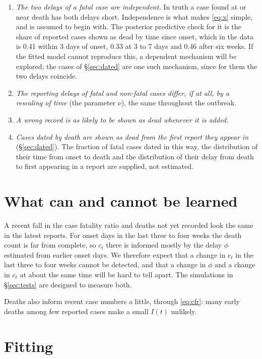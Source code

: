 \documentclass[11pt,a4paper]{article}
\begin{document}
\begin{enumerate}
\item \emph{The two delays of a fatal case are independent.} In truth a
case found at or near death has both delays short. Independence is what
makes \eqref{eq:x} simple, and is assumed to begin with. The posterior
predictive check for it is the share of reported cases shown as dead by time
since onset, which in the data is 0.41 within 3 days of onset, 0.33 at 3 to
7 days and 0.46 after six weeks. If the fitted model cannot reproduce this,
a dependent mechanism will be explored; the cases of \S\ref{sec:dated} are
one such mechanism, since for them the two delays coincide.
\item \emph{The reporting delays of fatal and non-fatal cases differ, if at
all, by a rescaling of time} (the parameter $\nu$), the same throughout the
outbreak.
\item \emph{A wrong record is as likely to be shown as dead whenever it is
added.}
\item \emph{Cases dated by death are shown as dead from the first report
they appear in} (\S\ref{sec:dated}). The fraction of fatal cases dated in
this way, the distribution of their time from onset to death and the
distribution of their delay from death to first appearing in a report are
supplied, not estimated.
\end{enumerate}

\section{What can and cannot be learned}\label{sec:identifiability}

A recent fall in the case fatality ratio and deaths not yet recorded look
the same in the latest reports. For onset days in the last three to four
weeks the death count is far from complete, so $c_t$ there is informed
mostly by the delay $\phi$ estimated from earlier onset days. We therefore
expect that a change in $c_t$ in the last three to four weeks cannot be
detected, and that a change in $\phi$ and a change in $c_t$ at about the same
time will be hard to tell apart. The simulations in \S\ref{sec:tests} are
designed to measure both.

Deaths also inform recent case numbers a little, through \eqref{eq:cfr}:
many early deaths among few reported cases make a small $I(t)$ unlikely.

\section{Fitting}\label{sec:fitting}
\end{document}
